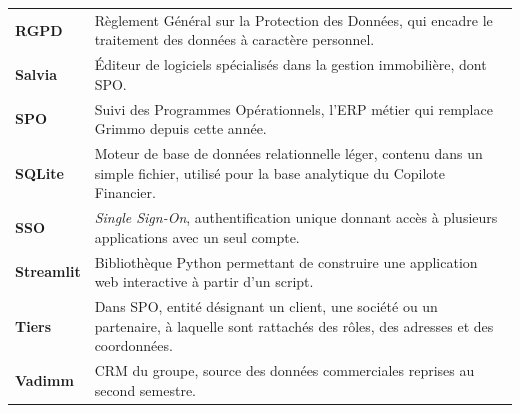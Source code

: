 \begin{longtable}{p{4cm} p{11cm}}
\textbf{RGPD} & Règlement Général sur la Protection des Données, qui encadre le traitement des données à caractère personnel. \\
\textbf{Salvia} & Éditeur de logiciels spécialisés dans la gestion immobilière, dont SPO. \\
\textbf{SPO} & Suivi des Programmes Opérationnels, l'ERP métier qui remplace Grimmo depuis cette année. \\
\textbf{SQLite} & Moteur de base de données relationnelle léger, contenu dans un simple fichier, utilisé pour la base analytique du Copilote Financier. \\
\textbf{SSO} & \emph{Single Sign-On}, authentification unique donnant accès à plusieurs applications avec un seul compte. \\
\textbf{Streamlit} & Bibliothèque Python permettant de construire une application web interactive à partir d'un script. \\
\textbf{Tiers} & Dans SPO, entité désignant un client, une société ou un partenaire, à laquelle sont rattachés des rôles, des adresses et des coordonnées. \\
\textbf{Vadimm} & CRM du groupe, source des données commerciales reprises au second semestre. \\
\end{longtable}
